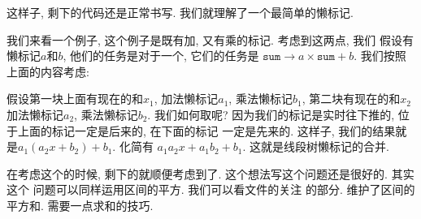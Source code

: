 这样子, 剩下的代码还是正常书写. 我们就理解了一个最简单的懒标记. 

我们来看一个例子, 这个例子是既有加, 又有乘的标记. 考虑到这两点, 我们
假设有懒标记$a$和$b$, 他们的任务是对于一个, 它们的任务是
$\texttt{sum} \to a\times\texttt{sum}+b$. 我们按照上面的内容考虑: 

 假设第一块上面有现在的和$x_1$, 加法懒标记$a_1$, 
乘法懒标记$b_1$, 第二块有现在的和$x_2$加法懒标记$a_2$, 乘法懒标记$b_2$. 我们如何取呢? 因为我们的标记是实时往下推的, 位于上面的标记一定是后来的, 在下面的标记
一定是先来的. 这样子, 我们的结果就是$a_1(a_2x+b_2)+b_1$. 化简有
$a_1a_2x+a_1b_2+b_1$. 这就是线段树懒标记的合并. 

在考虑这个的时候, 剩下的就顺便考虑到了. 这个想法写这个问题还是很好的. 其实这个
问题可以同样运用区间的平方. 我们可以看文件的关注
的部分. 维护了区间的平方和. 需要一点求和的技巧. 